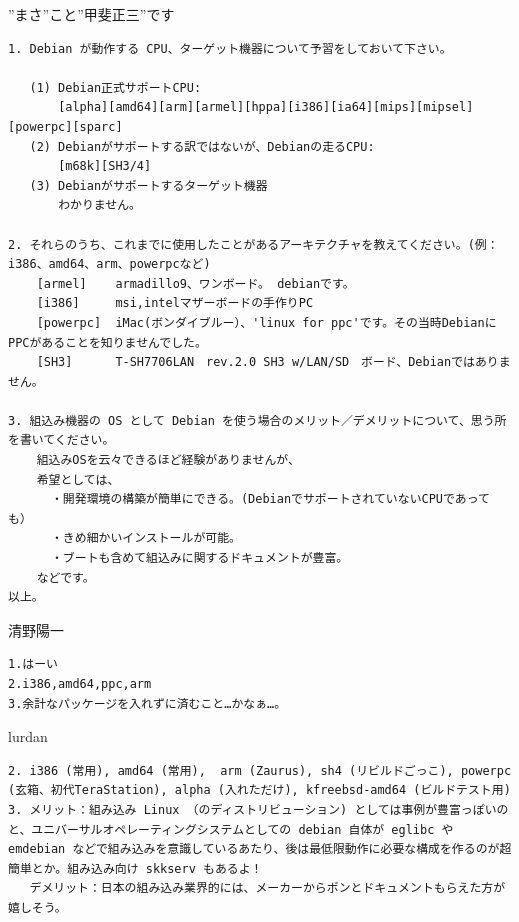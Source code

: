 \documentclass[mingoth,a4paper]{jsarticle}
\begin{document}
\begin{prework}{ ”まさ”こと”甲斐正三”です }

\begin{verbatim}
1. Debian が動作する CPU、ターゲット機器について予習をしておいて下さい。
 
   (1) Debian正式サポートCPU:
       [alpha][amd64][arm][armel][hppa][i386][ia64][mips][mipsel][powerpc][sparc]
   (2) Debianがサポートする訳ではないが、Debianの走るCPU:
       [m68k][SH3/4]
   (3) Debianがサポートするターゲット機器
       わかりません。
 
2. それらのうち、これまでに使用したことがあるアーキテクチャを教えてください。(例：i386、amd64、arm、powerpcなど)
    [armel]    armadillo9、ワンボード。 debianです。
    [i386]     msi,intelマザーボードの手作りPC
    [powerpc]  iMac(ボンダイブルー）、'linux for ppc'です。その当時DebianにPPCがあることを知りませんでした。
    [SH3]      T-SH7706LAN　rev.2.0 SH3 w/LAN/SD　ボード、Debianではありません。
 
3. 組込み機器の OS として Debian を使う場合のメリット／デメリットについて、思う所を書いてください。
    組込みOSを云々できるほど経験がありませんが、
    希望としては、
      ・開発環境の構築が簡単にできる。(DebianでサポートされていないCPUであっても）
      ・きめ細かいインストールが可能。
      ・ブートも含めて組込みに関するドキュメントが豊富。
    などです。
以上。
\end{verbatim}


\end{prework}

\begin{prework}{  清野陽一 }

\begin{verbatim}
1.はーい
2.i386,amd64,ppc,arm
3.余計なパッケージを入れずに済むこと…かなぁ…。
\end{verbatim}

\end{prework}

\begin{prework}{ lurdan }

\begin{verbatim}
2. i386 (常用), amd64 (常用),  arm (Zaurus), sh4 (リビルドごっこ), powerpc (玄箱、初代TeraStation), alpha (入れただけ), kfreebsd-amd64 (ビルドテスト用)
3. メリット：組み込み Linux （のディストリビューション) としては事例が豊富っぽいのと、ユニバーサルオペレーティングシステムとしての debian 自体が eglibc や emdebian などで組み込みを意識しているあたり、後は最低限動作に必要な構成を作るのが超簡単とか。組み込み向け skkserv もあるよ！
   デメリット：日本の組み込み業界的には、メーカーからポンとドキュメントもらえた方が嬉しそう。
\end{verbatim}

\end{prework}
\end{document}

